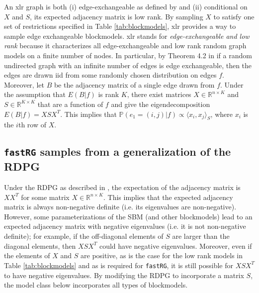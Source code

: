 \documentclass[twoside,11pt]{article}
\begin{document}
An xlr graph is both (i) edge-exchangeable as defined by \cite{crane2016edge} and (ii) conditional on $X$ and $S$, its expected adjacency matrix is low rank.  By sampling $X$ to satisfy one set of restrictions specified in Table \ref{tab:blockmodels}, xlr provides a way to sample edge exchangeable blockmodels.    xlr stands for \textit{edge-exchangeable and low rank} because it characterizes all edge-exchangeable and low rank random graph models on a finite number of nodes.  
In particular, by Theorem 4.2 in \cite{crane2016edge}  if a random undirected graph with an infinite number of edges is edge exchangeable, then the edges are drawn iid from some randomly chosen distribution on edges $f$.  Moreover, let $B$ be the adjacency matrix of a single edge drawn from $f$. Under the assumption that $E(B|f)$ is rank $K$, there exist matrices $X \in \mathds{R}^{n \times K}$ and $S \in \mathds{R}^{K \times K}$ that are a function of $f$ and give the eigendecomposition  $E(B|f) = X S X^T$.  This implies that $\mathbb{P}(e_1 = (i,j) | f) \propto \langle x_i,x_j \rangle _S$, where $x_i$ is the $i$th row of $X$. 







\subsection{\texttt{fastRG} samples from a generalization of the RDPG}
\label{gRPG}

Under the RDPG as described in \cite{Young2007}, the expectation of the adjacency matrix is $XX^T$ for some matrix $X \in \mathds{R}^{n \times K}$.  This implies that the expected adjacency matrix is always non-negative definite (i.e. its eigenvalues are non-negative).  However,  some parameterizations of the SBM (and other blockmodels) lead to an expected adjacency matrix with negative eigenvalues (i.e. it is not non-negative definite); for example, if the off-diagonal elements of $S$ are larger than the diagonal elements, then $XSX^T$ could have negative eigenvalues.  Moreover, even if the elements of $X$ and $S$ are positive, as is the case for the low rank models in Table \ref{tab:blockmodels} and as is required for \texttt{fastRG}, it is still possible for $XSX^T$ to have negative eigenvalues.
By modifying the RDPG to incorporate a matrix $S$, the model class below incorporates all types of blockmodels.
\end{document}
